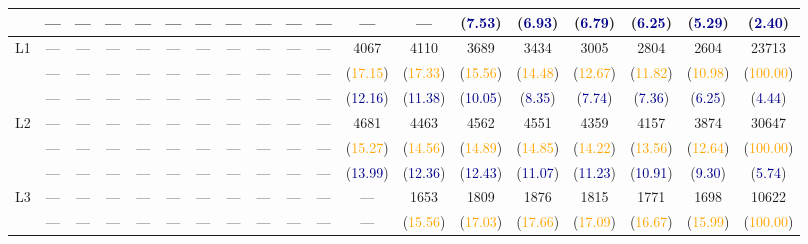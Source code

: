 {\begin{tabular}{cccccccccc|ccccccccc}
            &---&---&---&---&---&---&---&---&---&---&---&---&(\textcolor{darkblue}{7.53})&(\textcolor{darkblue}{6.93})&(\textcolor{darkblue}{6.79})&(\textcolor{darkblue}{6.25})&(\textcolor{darkblue}{5.29})&(\textcolor{darkblue}{2.40})\\\midrule
\multirow{3}{*}{L1}&          ---&          ---&          ---&          ---&          ---&          ---&          ---&          ---&          ---&          ---&        4067&        4110&        3689&        3434&        3005&        2804&        2604&       23713\\
            &---&---&---&---&---&---&---&---&---&---&(\textcolor{orange}{17.15})&(\textcolor{orange}{17.33})&(\textcolor{orange}{15.56})&(\textcolor{orange}{14.48})&(\textcolor{orange}{12.67})&(\textcolor{orange}{11.82})&(\textcolor{orange}{10.98})&(\textcolor{orange}{100.00})\\
            &---&---&---&---&---&---&---&---&---&---&(\textcolor{darkblue}{12.16})&(\textcolor{darkblue}{11.38})&(\textcolor{darkblue}{10.05})&(\textcolor{darkblue}{8.35})&(\textcolor{darkblue}{7.74})&(\textcolor{darkblue}{7.36})&(\textcolor{darkblue}{6.25})&(\textcolor{darkblue}{4.44})\\\midrule
\multirow{3}{*}{L2}&          ---&          ---&          ---&          ---&          ---&          ---&          ---&          ---&          ---&          ---&        4681&        4463&        4562&        4551&        4359&        4157&        3874&       30647\\
            &---&---&---&---&---&---&---&---&---&---&(\textcolor{orange}{15.27})&(\textcolor{orange}{14.56})&(\textcolor{orange}{14.89})&(\textcolor{orange}{14.85})&(\textcolor{orange}{14.22})&(\textcolor{orange}{13.56})&(\textcolor{orange}{12.64})&(\textcolor{orange}{100.00})\\
            &---&---&---&---&---&---&---&---&---&---&(\textcolor{darkblue}{13.99})&(\textcolor{darkblue}{12.36})&(\textcolor{darkblue}{12.43})&(\textcolor{darkblue}{11.07})&(\textcolor{darkblue}{11.23})&(\textcolor{darkblue}{10.91})&(\textcolor{darkblue}{9.30})&(\textcolor{darkblue}{5.74})\\\midrule
\multirow{3}{*}{L3}&          ---&          ---&          ---&          ---&          ---&          ---&          ---&          ---&          ---&          ---&          ---&        1653&        1809&        1876&        1815&        1771&        1698&       10622\\
            &---&---&---&---&---&---&---&---&---&---&---&(\textcolor{orange}{15.56})&(\textcolor{orange}{17.03})&(\textcolor{orange}{17.66})&(\textcolor{orange}{17.09})&(\textcolor{orange}{16.67})&(\textcolor{orange}{15.99})&(\textcolor{orange}{100.00})\\

\end{tabular}}
